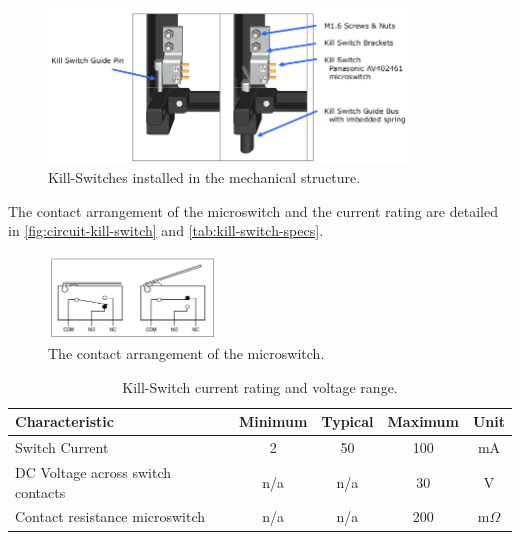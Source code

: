 \begin{figure}[!ht]
    \begin{center}
        \includegraphics[width=0.85\textwidth]{figures/subsystems/kill-switch-installed}
        \caption{Kill-Switches installed in the mechanical structure.}
        \label{fig:kill-switch-installed}
    \end{center}
\end{figure}

The contact arrangement of the microswitch and the current rating are detailed in \autoref{fig:circuit-kill-switch} and \autoref{tab:kill-switch-specs}.

\begin{figure}[!ht]
    \begin{center}
        \includegraphics[width=0.4\textwidth]{figures/subsystems/circuit-kill-switch}
        \caption{The contact arrangement of the microswitch.}
        \label{fig:circuit-kill-switch}
    \end{center}
\end{figure}

\begin{table}[!h]
    \centering
    \begin{tabular}{lcccc}
        \toprule[1.5pt]
        \textbf{Characteristic} & \textbf{Minimum} & \textbf{Typical} & \textbf{Maximum} & \textbf{Unit} \\
        \midrule
        Switch Current                      & 2     & 50    & 100   & mA \\
        DC Voltage across switch contacts   & n/a   & n/a   & 30    & V \\
        Contact resistance microswitch      & n/a   & n/a   & 200   & m$\Omega$ \\
        \bottomrule[1.5pt]
    \end{tabular}
    \caption{Kill-Switch current rating and voltage range.}
    \label{tab:kill-switch-specs}
\end{table}


